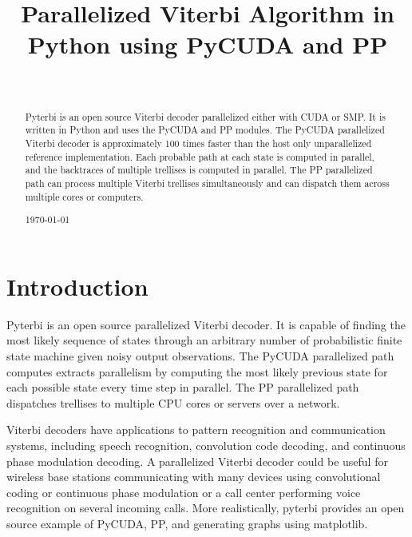 \documentclass[journal,onecolumn]{IEEEtran}
\begin{document}
\title{Parallelized Viterbi Algorithm in Python using PyCUDA and PP}
\author{\\
    }


\maketitle

\begin{abstract}
Pyterbi is an open source Viterbi decoder parallelized either with CUDA or SMP. It is written in Python and uses the PyCUDA and PP modules. The PyCUDA parallelized Viterbi decoder is approximately 100 times faster than the host only unparallelized reference implementation. Each probable path at each state is computed in parallel, and the backtraces of multiple trellises is computed in parallel. The PP parallelized path can process multiple Viterbi trellises simultaneously and can dispatch them across multiple cores or computers.  

\hfill \today 
\end{abstract}

\section{Introduction}
Pyterbi is an open source parallelized Viterbi decoder. It is capable of finding the most likely sequence of states through an arbitrary number of probabilistic finite state machine given noisy output observations. The PyCUDA parallelized path computes extracts parallelism by computing the most likely previous state for each possible state every time step in parallel. The PP parallelized path dispatches trellises to multiple CPU cores or servers over a network.


Viterbi decoders have applications to pattern recognition and communication systems, including speech recognition, convolution code decoding, and continuous phase modulation decoding. A parallelized Viterbi decoder could be useful for wireless base stations communicating with many devices using convolutional coding or continuous phase modulation or a call center performing voice recognition on several incoming calls. More realistically, pyterbi provides an open source example of PyCUDA, PP, and generating graphs using matplotlib.   
\end{document}
